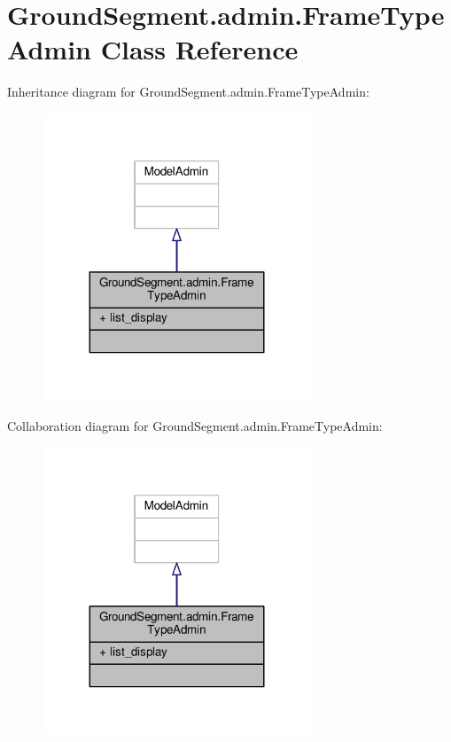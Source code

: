 \hypertarget{class_ground_segment_1_1admin_1_1_frame_type_admin}{}\section{Ground\+Segment.\+admin.\+Frame\+Type\+Admin Class Reference}
\label{class_ground_segment_1_1admin_1_1_frame_type_admin}


Inheritance diagram for Ground\+Segment.\+admin.\+Frame\+Type\+Admin\+:\nopagebreak
\begin{figure}[H]
\begin{center}
\leavevmode
\includegraphics[width=227pt]{class_ground_segment_1_1admin_1_1_frame_type_admin__inherit__graph}
\end{center}
\end{figure}


Collaboration diagram for Ground\+Segment.\+admin.\+Frame\+Type\+Admin\+:\nopagebreak
\begin{figure}[H]
\begin{center}
\leavevmode
\includegraphics[width=227pt]{class_ground_segment_1_1admin_1_1_frame_type_admin__coll__graph}
\end{center}
\end{figure}
